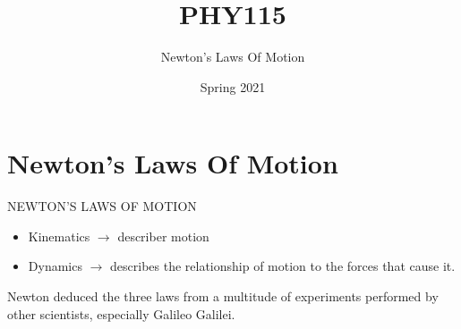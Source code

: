 \documentclass[]{beamer}
\title{PHY115}    %
\author{Newton's Laws Of Motion}                 %
\institute{Digipen}      %
\date{Spring 2021}
\begin{document}
\begin{frame}
  \titlepage
\end{frame}

\section[]{}

\begin{frame}
  \tableofcontents
\end{frame}

\section{Newton's Laws Of Motion}


               \begin{frame}
NEWTON'S LAWS OF MOTION

\vspace{5mm}


\begin{itemize}
    \item Kinematics $\rightarrow$ describer motion
\item Dynamics $\rightarrow$ describes the relationship
of motion to the forces that cause it.
\end{itemize}
    
\end{frame}




\begin{frame}




Newton  deduced the three laws from
a multitude of experiments performed by other scientists, especially Galileo
Galilei.



\end{frame}
\end{document}
